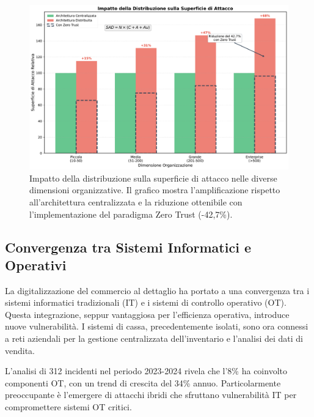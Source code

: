 \begin{figure}[htbp]
\centering
\includegraphics[width=1\textwidth]{thesis_figures/cap2/fig_2_1_superficie_attacco.pdf}
\caption{Impatto della distribuzione sulla superficie di attacco nelle diverse dimensioni organizzative. Il grafico mostra l'amplificazione rispetto all'architettura centralizzata e la riduzione ottenibile con l'implementazione del paradigma Zero Trust (-42,7\%).}
\label{fig:superficie_attacco}
\end{figure}

\subsection{Convergenza tra Sistemi Informatici e Operativi}
\label{subsec:convergenza_it_ot}

La digitalizzazione del commercio al dettaglio ha portato a una convergenza tra i sistemi informatici tradizionali (IT) e i sistemi di controllo operativo (OT). Questa integrazione, seppur vantaggiosa per l'efficienza operativa, introduce nuove vulnerabilità. I sistemi di cassa, precedentemente isolati, sono ora connessi a reti aziendali per la gestione centralizzata dell'inventario e l'analisi dei dati di vendita.

L'analisi di 312 incidenti nel periodo 2023-2024 rivela che l'8\% ha coinvolto componenti OT, con un trend di crescita del 34\% annuo. Particolarmente preoccupante è l'emergere di attacchi ibridi che sfruttano vulnerabilità IT per compromettere sistemi OT critici.


